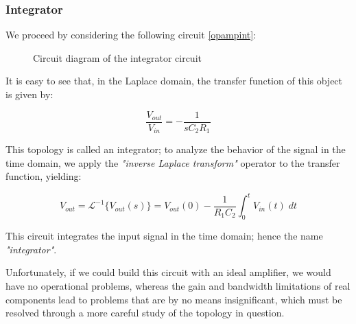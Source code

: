 \documentclass[../main.tex]{subfiles}
\begin{document}
\subsubsection{Integrator}


We proceed by considering the following circuit \autoref{opampint}:

\begin{figure}[h!]
\begin{center}


\label{opampint}
\caption{Circuit diagram of the integrator circuit}	
\end{center}	
\end{figure}


It is easy to see that, in the Laplace domain, the transfer function of this object is given by:

\begin{equation}
	\frac{V_{out}}{V_{in}} = - \frac{1}{sC_2R_1}
\end{equation}


This topology is called an integrator; to analyze the behavior of the signal in the time domain, we apply the \textit{"inverse Laplace transform"} operator to the transfer function, yielding:

\begin{equation}
	V_{out} = \mathcal{L}^{-1} \{ V_{out}(s)\} = V_{out}(0) - \frac{1}{R_1C_2} \int_0^t V_{in}(t)\; dt
\end{equation}

This circuit integrates the input signal in the time domain; hence the name \textit{"integrator"}. 

Unfortunately, if we could build this circuit with an ideal amplifier, we would have no operational problems, whereas the gain and bandwidth limitations of real components lead to problems that are by no means insignificant, which must be resolved through a more careful study of the topology in question.\\
\end{document}
